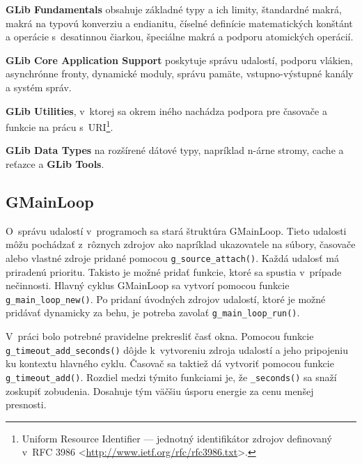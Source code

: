 \documentclass[12pt,oneside,final]{fithesis2}
\begin{document}
\textbf{GLib Fundamentals} obsahuje základné typy a ich limity, štandardné makrá, makrá na typovú konverziu a endianitu, číselné definície matematických konštánt a operácie s~desatinnou čiarkou, špeciálne makrá a podporu atomických operácií.

\textbf{GLib Core Application Support} poskytuje správu udalostí, podporu vlákien, asynchrónne fronty, dynamické moduly, správu pamäte, vstupno-výstupné kanály a systém správ.
 
\textbf{GLib Utilities}, v~ktorej sa okrem iného nachádza podpora pre časovače a funkcie na prácu s~URI\footnote{Uniform Resource Identifier --- jednotný identifikátor zdrojov definovaný v~RFC 3986 <\url{http://www.ietf.org/rfc/rfc3986.txt}>.}.

\textbf{GLib Data Types} na rozšírené dátové typy, napríklad n-árne stromy, cache a reťazce a \textbf{GLib Tools}.

\subsection{GMainLoop}
O~správu udalostí v~programoch sa stará štruktúra GMainLoop. Tieto udalosti môžu pochádzať z~rôznych zdrojov ako napríklad ukazovatele na súbory, časovače alebo vlastné zdroje pridané pomocou \texttt{g\_source}\texttt{\_attach()}. Každá udalosť má priradenú prioritu. Takisto je možné pridať funkcie, ktoré sa spustia v~prípade nečinnosti. Hlavný cyklus GMainLoop sa vytvorí pomocou funkcie \texttt{g\_main\_loop\_new()}. Po pridaní úvodných zdrojov udalostí, ktoré je možné pridávať dynamicky za behu, je potreba zavolať \texttt{g\_main\_loop\_run()}.

V~práci bolo potrebné pravidelne prekresliť časť okna. Pomocou funkcie \texttt{g\_timeout\_add\_seconds()} dôjde k~vytvoreniu zdroja udalostí a jeho pripojeniu ku kontextu hlavného cyklu. Časovač sa taktiež dá vytvoriť pomocou funkcie \texttt{g\_timeout\_add()}. Rozdiel medzi týmito funkciami je, že \texttt{\_seconds()} sa snaží zoskupiť zobudenia. Dosahuje tým väčšiu úsporu energie za cenu menšej presnosti.
\end{document}
